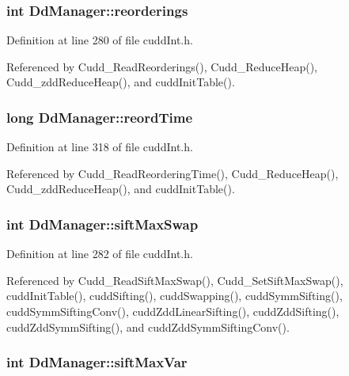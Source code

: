 \subsubsection{\setlength{\rightskip}{0pt plus 5cm}int \bf{Dd\-Manager::reorderings}}\label{structDdManager_1f55bbf3deeae80dc224411c74666235}




Definition at line 280 of file cudd\-Int.h.

Referenced by Cudd\_\-Read\-Reorderings(), Cudd\_\-Reduce\-Heap(), Cudd\_\-zdd\-Reduce\-Heap(), and cudd\-Init\-Table().
\subsubsection{\setlength{\rightskip}{0pt plus 5cm}long \bf{Dd\-Manager::reord\-Time}}\label{structDdManager_5018a3a1f2fc17bf8aecf5c8b375963c}




Definition at line 318 of file cudd\-Int.h.

Referenced by Cudd\_\-Read\-Reordering\-Time(), Cudd\_\-Reduce\-Heap(), Cudd\_\-zdd\-Reduce\-Heap(), and cudd\-Init\-Table().
\subsubsection{\setlength{\rightskip}{0pt plus 5cm}int \bf{Dd\-Manager::sift\-Max\-Swap}}\label{structDdManager_6521157f9436fb77fcc6327b2035e422}




Definition at line 282 of file cudd\-Int.h.

Referenced by Cudd\_\-Read\-Sift\-Max\-Swap(), Cudd\_\-Set\-Sift\-Max\-Swap(), cudd\-Init\-Table(), cudd\-Sifting(), cudd\-Swapping(), cudd\-Symm\-Sifting(), cudd\-Symm\-Sifting\-Conv(), cudd\-Zdd\-Linear\-Sifting(), cudd\-Zdd\-Sifting(), cudd\-Zdd\-Symm\-Sifting(), and cudd\-Zdd\-Symm\-Sifting\-Conv().
\subsubsection{\setlength{\rightskip}{0pt plus 5cm}int \bf{Dd\-Manager::sift\-Max\-Var}}\label{structDdManager_751612508e0ff55d364279b55872c40d}




